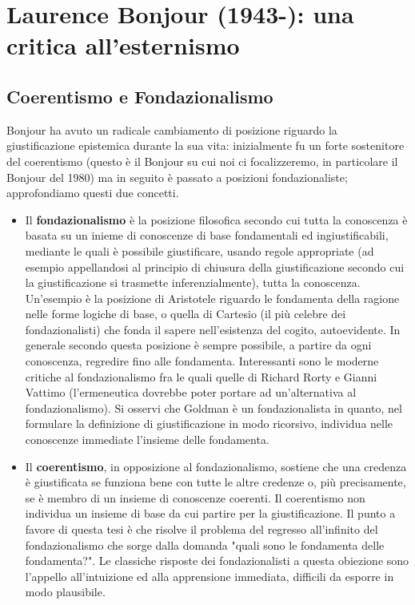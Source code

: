 \documentclass[10pt,a4paper]{article}
\begin{document}
\section{Laurence Bonjour (1943-): una critica all'esternismo}\label{sec:Bonjour}
\subsection{Coerentismo e Fondazionalismo}
Bonjour ha avuto un radicale cambiamento di posizione riguardo la giustificazione epistemica durante la sua vita: inizialmente fu un forte sostenitore del coerentismo (questo è il Bonjour su cui noi ci focalizzeremo, in particolare il Bonjour del 1980) ma in seguito è passato a posizioni fondazionaliste; approfondiamo questi due concetti. 
\begin{itemize}
	\item Il \textbf{fondazionalismo} è la posizione filosofica secondo cui tutta la conoscenza è basata su un inieme di conoscenze di base fondamentali ed ingiustificabili, mediante le quali è possibile giustificare, usando regole appropriate (ad esempio appellandosi al principio di chiusura della giustificazione secondo cui la giustificazione si trasmette inferenzialmente), tutta la conoscenza. Un'esempio è la posizione di Aristotele riguardo le fondamenta della ragione nelle forme logiche di base, o quella di Cartesio (il più celebre dei fondazionalisti) che fonda il sapere nell'esistenza del cogito, autoevidente. In generale secondo questa posizione è sempre possibile, a partire da ogni conoscenza, regredire fino alle fondamenta. Interessanti sono le moderne critiche al fondazionalismo fra le quali quelle di Richard Rorty e Gianni Vattimo (l'ermeneutica dovrebbe poter portare ad un'alternativa al fondazionalismo). Si osservi che Goldman è un fondazionalista in quanto, nel formulare la definizione di giustificazione in modo ricorsivo, individua nelle conoscenze immediate l'insieme delle fondamenta. 
	\item Il \textbf{coerentismo}, in opposizione al fondazionalismo, sostiene che una credenza è giustificata se funziona bene con tutte le altre credenze o, più precisamente, se è membro di un insieme di conoscenze coerenti. Il coerentismo non individua un insieme di base da cui partire per la giustificazione. Il punto a favore di questa tesi è che risolve il problema del regresso all'infinito del fondazionalismo che sorge dalla domanda "quali sono le fondamenta delle fondamenta?". Le classiche risposte dei fondazionalisti a questa obiezione sono l'appello all'intuizione ed alla apprensione immediata, difficili da esporre in modo plausibile.
\end{itemize}
\end{document}
